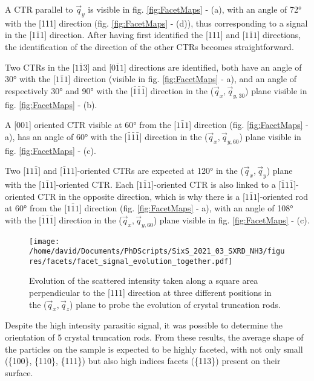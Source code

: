 A CTR parallel to $\vec{q}_y$ is visible in fig. \ref{fig:FacetMaps} - (a), with an angle of \ang{72} with the [111] direction (fig. \ref{fig:FacetMaps} - (d)), thus corresponding to a signal in the [1$\bar{1}$1] direction.
After having first identified the [111] and [$1\bar{1}1$] directions, the identification of the direction of the other CTRs becomes straightforward.

Two CTRs in the [$1\bar{1}3$] and [$0\bar{1}1$] directions are identified, both have an angle of \ang{30} with the [$1\bar{1}1$] direction (visible in  fig. \ref{fig:FacetMaps} - a), and an angle of respectively \ang{30} and \ang{90} with the [$\bar{1}\bar{1}\bar{1}$] direction in the ($\vec{q}_x, \vec{q}_{y, 30}$) plane visible in fig. \ref{fig:FacetMaps} - (b).

A [001] oriented CTR visible at \ang{60} from the [$1\bar{1}1$] direction (fig. \ref{fig:FacetMaps} - a), has an angle of \ang{60} with the [$\bar{1}\bar{1}\bar{1}$] direction in the ($\vec{q}_x, \vec{q}_{y, 60}$) plane visible in fig. \ref{fig:FacetMaps} - (c).

Two [$11\bar{1}$] and [$\bar{1}11$]-oriented CTRs are expected at \ang{120} in the ($\vec{q}_x, \vec{q}_y$) plane with the [$1\bar{1}1$]-oriented CTR.
Each [$1\bar{1}1$]-oriented CTR is also linked to a [$\bar{1}1\bar{1}$]-oriented CTR in the opposite direction, which is why there is a [$1\bar{1}1$]-oriented rod at \ang{60} from the [$1\bar{1}1$] direction (fig. \ref{fig:FacetMaps} - a), with an angle of \ang{108} with the [$\bar{1}\bar{1}\bar{1}$] direction in the ($\vec{q}_x, \vec{q}_{y, 60}$) plane visible in fig. \ref{fig:FacetMaps} - (c).

\begin{figure}[!htb]
    \centering
    \texttt{[image: /home/david/Documents/PhDScripts/SixS\_2021\_03\_SXRD\_NH3/figures/facets/facet\_signal\_evolution\_together.pdf]}
    \caption{
    Evolution of the scattered intensity taken along a square area perpendicular to the [111] direction at three different positions in the ($\vec{q}_x, \vec{q}_z$) plane to probe the evolution of crystal truncation rods.
    }
    \label{fig:FacetSignal}
\end{figure}

Despite the high intensity parasitic signal, it was possible to determine the orientation of 5 crystal truncation rods.
From these results, the average shape of the particles on the sample is expected to be highly faceted, with not only small (\{100\}, \{110\}, \{111\}) but also high indices facets (\{113\}) present on their surface.

